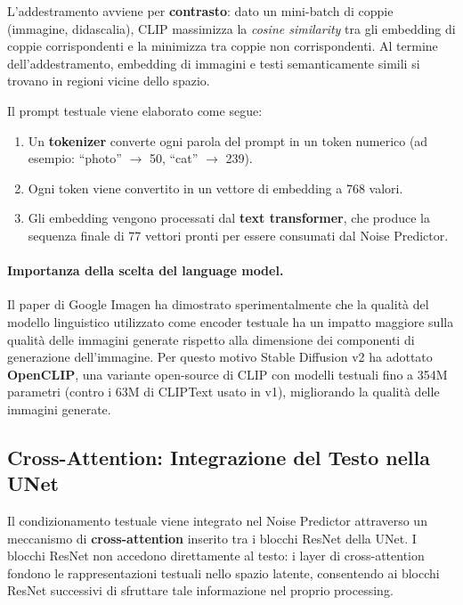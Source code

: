 L'addestramento avviene per \textbf{contrasto}: dato un mini-batch di
coppie (immagine, didascalia), CLIP massimizza la \emph{cosine
similarity} tra gli embedding di coppie corrispondenti e la minimizza
tra coppie non corrispondenti. Al termine dell'addestramento, embedding
di immagini e testi semanticamente simili si trovano in regioni vicine
dello spazio.

Il prompt testuale viene elaborato come segue:
\begin{enumerate}
  \item Un \textbf{tokenizer} converte ogni parola del prompt in un
        token numerico (ad esempio: ``photo'' $\to$ 50, ``cat'' $\to$
        239).
  \item Ogni token viene convertito in un vettore di embedding a 768
        valori.
  \item Gli embedding vengono processati dal \textbf{text transformer},
        che produce la sequenza finale di 77 vettori pronti per essere
        consumati dal Noise Predictor.
\end{enumerate}

\paragraph{Importanza della scelta del language model.} Il paper di
Google Imagen ha dimostrato sperimentalmente che la qualità del
modello linguistico utilizzato come encoder testuale ha un impatto
maggiore sulla qualità delle immagini generate rispetto alla dimensione
dei componenti di generazione dell'immagine. Per questo motivo Stable
Diffusion v2 ha adottato \textbf{OpenCLIP}, una variante open-source
di CLIP con modelli testuali fino a 354M parametri (contro i 63M di
CLIPText usato in v1), migliorando la qualità delle immagini generate.

\subsection{Cross-Attention: Integrazione del Testo nella UNet}
\label{subsec:cross-attention}

Il condizionamento testuale viene integrato nel Noise Predictor attraverso
un meccanismo di \textbf{cross-attention} inserito tra i blocchi ResNet
della UNet. I blocchi ResNet non accedono direttamente al testo:
i layer di cross-attention fondono le rappresentazioni testuali nello
spazio latente, consentendo ai blocchi ResNet successivi di sfruttare
tale informazione nel proprio processing.

